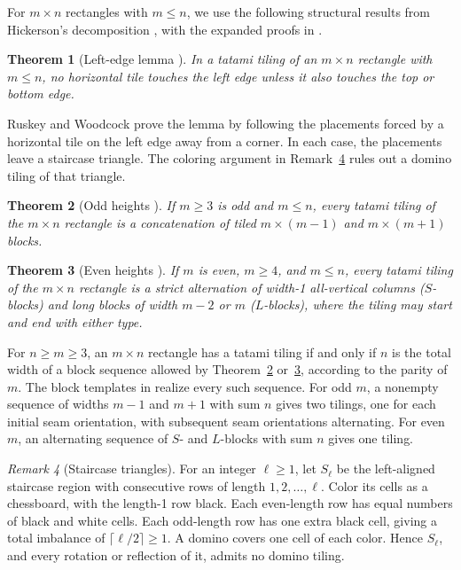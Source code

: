 \documentclass[11pt, reqno]{amsart}
\newtheorem{theorem}{Theorem}[section]
\theoremstyle{definition}
\theoremstyle{remark}
\newtheorem{remark}[theorem]{Remark}
\numberwithin{equation}{section}
\begin{document}
For $m\times n$ rectangles with $m\le n$, we use the following
structural results from Hickerson's decomposition \cite{hickerson},
with the expanded proofs in \cite[Section~2]{ruskey}.

\begin{theorem}[Left-edge lemma {\cite[Theorem~2.2]{ruskey}}]
    \label{thm:left-edge}
    In a tatami tiling of an $m \times n$ rectangle with $m \le n$, no
    horizontal tile touches the left edge unless it also touches the top or
    bottom edge.
\end{theorem}

Ruskey and Woodcock prove the lemma by following the placements forced
by a horizontal tile on the left edge away from a corner. In each case,
the placements leave a staircase triangle. The coloring argument in
Remark~\ref{rem:staircase} rules out a domino tiling of that triangle.

\begin{theorem}[Odd heights {\cite[Theorem~2.3]{ruskey}}]
    \label{thm:odd}
    If $m\ge3$ is odd and $m \le n$, every tatami tiling of the $m \times n$
    rectangle is a concatenation of tiled $m \times (m-1)$ and $m \times
        (m+1)$ blocks.
\end{theorem}

\begin{theorem}[Even heights {\cite[Theorem~2.4]{ruskey}}]
    \label{thm:even}
    If $m$ is even, $m \ge 4$, and $m \le n$, every tatami tiling of the $m
        \times n$ rectangle is a strict alternation of width-1 all-vertical
    columns ($S$-blocks) and long blocks of width $m-2$ or $m$ ($L$-blocks),
    where the tiling may start and end with either type.
\end{theorem}

For $n\ge m\ge3$, an $m\times n$ rectangle has a tatami tiling if and
only if $n$ is the total width of a block sequence allowed by
Theorem~\ref{thm:odd} or~\ref{thm:even}, according to the parity of $m$.
The block templates in \cite{hickerson,ruskey} realize every such
sequence. For odd $m$, a nonempty sequence of widths $m-1$ and $m+1$
with sum $n$ gives two tilings, one for each initial seam orientation,
with subsequent seam orientations alternating. For even $m$, an alternating
sequence of $S$- and $L$-blocks with sum $n$ gives one tiling.

\begin{remark}[Staircase triangles]
    \label{rem:staircase}
    For an integer $\ell\ge1$, let $S_\ell$ be the left-aligned staircase
    region with consecutive rows of length $1, 2, \dots, \ell$.
    Color its cells as a chessboard, with the length-1 row black. Each
    even-length row has equal numbers of black and white cells. Each
    odd-length row has one extra black cell, giving a total imbalance of
    $\lceil \ell/2 \rceil \ge 1$. A domino covers one cell of each color.
    Hence $S_\ell$, and every rotation or reflection of it, admits no
    domino tiling.
\end{remark}
\end{document}
